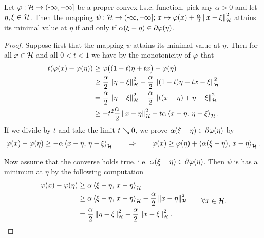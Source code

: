 \begin{lemma}\label{lemma:cond prop conv. l.s.c. sub diff}
	Let $ \vp:\rH \ra \eRR $ be a proper convex l.s.c.
	function, pick any $ \alpha > 0 $ and let
	$ \eta,\xi\in\mathcal{H} $. Then the mapping $ \psi:\rH \ra \eRR;\, 
	x\mapsto \vp(x)+\frac{\alpha}{2}\norm{x-\xi}^2$
	attains its minimal value at $ \eta $ if and only if
	$ \alpha(\xi-\eta) \in \partial \varphi(\eta) $.
\end{lemma}
\begin{proof}
	Suppose first that the mapping $ \psi $ attains its minimal value at
	$ \eta $. Then for all $ x\in\mathcal{H} $ and all $ 0<t<1 $ we have
	by the monotonicity of $ \varphi $ that
	\begin{align*}
		t(\varphi(x)-\varphi(\eta))
		&\geq \varphi\big((1-t)\eta+tx\big)-\varphi(\eta)\\
		&\geq \frac{\alpha}{2}\left\Vert \eta-\xi\right\Vert_{\mathcal{H}}^2
		-\frac{\alpha}{2}\left\Vert (1-t)\eta+tx-\xi\right\Vert_{\mathcal{H}}^2\\
		&= \frac{\alpha}{2}\left\Vert \eta-\xi\right\Vert_{\mathcal{H}}^2
		-\frac{\alpha}{2}\left\Vert t(x-\eta)+\eta-\xi\right\Vert_{\mathcal{H}}^2\\
		&\geq -t^2\frac{\alpha}{2}\left\Vert x-\eta\right\Vert_{\mathcal{H}}^2
		-t\alpha\left\langle x-\eta,\,\eta-\xi\right\rangle_{\mathcal{H}}.
	\end{align*}
	If we divide by $ t $ and take the limit $ t\searrow 0 $, 
	we prove $ \alpha(\xi-\eta)\in\partial\varphi(\eta) $ by
	\begin{align*}
		\varphi(x)-\varphi(\eta)
		\geq -\alpha\left\langle x-\eta,\,\eta-\xi\right\rangle_{\mathcal{H}}
		\qquad\Rightarrow\qquad
		\varphi(x)
		\geq \varphi(\eta)+\left\langle \alpha(\xi-\eta),\,x-\eta\right\rangle_{\mathcal{H}}.
	\end{align*}

	Now assume that the converse holds true, i.e.
	$ \alpha(\xi-\eta)\in\partial\varphi(\eta) $. Then $ \psi $ is has
	a minimum at $ \eta $ by the following computation
	\begin{align*}
		\begin{split}
			\varphi(x)-\varphi(\eta)
			&\geq \alpha\left\langle \xi-\eta,\,x-\eta\right\rangle_{\mathcal{H}}\\
			&\geq \alpha\left\langle \xi-\eta,\,x-\eta\right\rangle_{\mathcal{H}}-\frac{\alpha}{2}\left\Vert x-\eta\right\Vert_{\mathcal{H}}^2\\
			&=\frac{\alpha}{2}\left\Vert \eta-\xi\right\Vert_{\mathcal{H}}^2-\frac{\alpha}{2}\left\Vert x-\xi\right\Vert_{\mathcal{H}}^2.
		\end{split}
		\qquad
		\forall x\in \mathcal{H}.
	\end{align*}
\end{proof}

